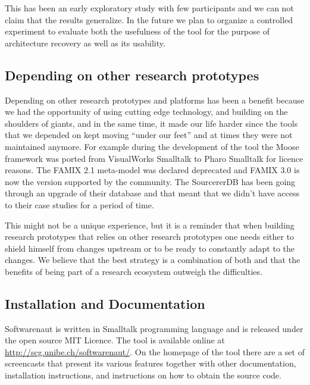 \documentclass[preprint,12pt]{elsarticle}
\begin{document}
This has been an early exploratory study with few participants and we can not claim that the results generalize. In the future we plan to organize a controlled experiment to evaluate both the usefulness of the tool for the purpose of architecture recovery as well as its usability.

\subsection {Depending on other research prototypes }

Depending on other research prototypes and platforms has been a benefit because we had the opportunity of using cutting edge technology, and building on the shoulders of giants, and in the same time, it made our life harder since the tools that we depended on kept moving ``under our feet'' and at times they were not maintained anymore. For example during the development of the tool the Moose framework was ported from VisualWorks Smalltalk to Pharo Smalltalk for licence reasons. The FAMIX 2.1 meta-model was declared deprecated and FAMIX 3.0 is now the version supported by the community. The SourcererDB has been going through an upgrade of their database and that meant that we didn't have access to their case studies for a period of time. 

This might not be a unique experience, but it is a reminder that when building research prototypes that relies on other research prototypes one needs either to shield himself from changes upstream or to be ready to constantly adapt to the changes. We believe that the best strategy is a combination of both and that the benefits of being part of a research ecosystem outweigh the difficulties.

\subsection {Installation and Documentation}

Softwarenaut is written in Smalltalk programming language and is released under the open source MIT Licence. The tool is available online at {\footnotesize \url{http://scg.unibe.ch/softwarenaut/}}. On the homepage of the tool there are a set of screencasts that present its various features together with other documentation, installation instructions, and instructions on how to obtain the source code. 
\end{document}
